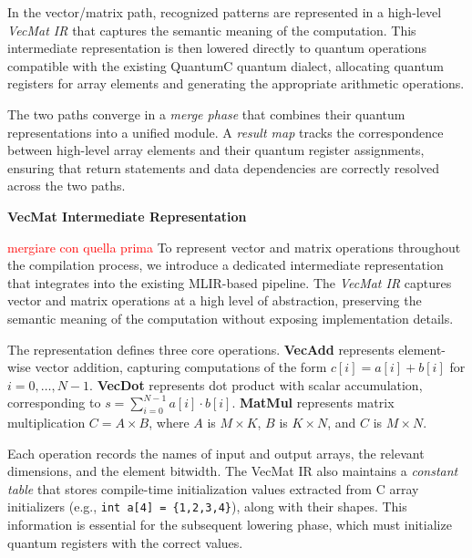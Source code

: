 In the vector/matrix path, recognized patterns are represented in a high-level \emph{VecMat IR} that captures the semantic meaning of the computation. This intermediate representation is then lowered directly to quantum operations compatible with the existing QuantumC quantum dialect, allocating quantum registers for array elements and generating the appropriate arithmetic operations.

The two paths converge in a \emph{merge phase} that combines their quantum representations into a unified module. A \emph{result map} tracks the correspondence between high-level array elements and their quantum register assignments, ensuring that return statements and data dependencies are correctly resolved across the two paths.

\textbf{VecMat Intermediate Representation}
\label{sec:intermediate-repr}

\textcolor{red}{mergiare con quella prima }
To represent vector and matrix operations throughout the compilation process, we introduce a dedicated intermediate representation that integrates into the existing MLIR-based pipeline. The \emph{VecMat IR} captures vector and matrix operations at a high level of abstraction, preserving the semantic meaning of the computation without exposing implementation details.

The representation defines three core operations. \textbf{VecAdd} represents element-wise vector addition, capturing computations of the form $c[i] = a[i] + b[i]$ for $i = 0, \ldots, N-1$. \textbf{VecDot} represents dot product with scalar accumulation, corresponding to $s = \sum_{i=0}^{N-1} a[i] \cdot b[i]$. \textbf{MatMul} represents matrix multiplication $C = A \times B$, where $A$ is $M \times K$, $B$ is $K \times N$, and $C$ is $M \times N$.

Each operation records the names of input and output arrays, the relevant dimensions, and the element bitwidth. The VecMat IR also maintains a \emph{constant table} that stores compile-time initialization values extracted from C array initializers (e.g., \texttt{int a[4] = \{1,2,3,4\}}), along with their shapes. This information is essential for the subsequent lowering phase, which must initialize quantum registers with the correct values.

